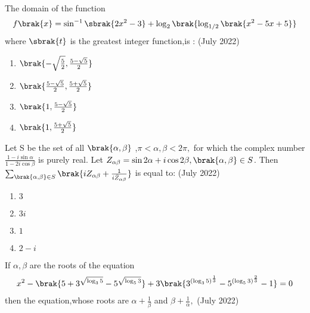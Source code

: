 \iffalse
\title{July 2022}
\author{EE24BTECH11058}
\section{mcq-single}
\fi

    \item The domain of the function 
    \begin{align*}
        f\brak{x} = \sin^{-1}\sbrak{2x^2 - 3}+ \log_2\brak{\log_{1/2}\brak{x^2 - 5x + 5}}
    \end{align*} where $\sbrak{t}$ is the greatest integer function,is : 
    \hfill(July 2022)
    
    \begin{enumerate}
        \item $\brak{-\sqrt{\frac{5}{2}},\frac{5-\sqrt{5}}{2}}$
        \item $\brak{\frac{5-\sqrt{5}}{2}, \frac{5+\sqrt{5}}{2}}$
        \item $\brak{1,\frac{5-\sqrt{5}}{2}}$ 
        \item $\brak{1,\frac{5+\sqrt{5}}{2}}$ \\
    \end{enumerate}
    

    \item Let S be the set of all $\brak{\alpha,\beta}$ ,$\pi <\alpha, \beta < 2\pi , $ for which the complex number $\frac{1-i\sin\alpha}{1-2i\cos\beta}$ is purely real. Let $Z_{\alpha\beta} =\sin2\alpha + i\cos2\beta,\brak{\alpha,\beta} \in S $. Then $\sum_{\brak{\alpha,\beta}\in S }\brak{iZ_{\alpha\beta} + \frac{1}{i\bar{Z}_{\alpha\beta}}} $ is equal to:
    \hfill(July 2022)
    
    
    \begin{enumerate}
        \item $3$
        \item $3i$
        \item $1$
        \item $2-i$
    \end{enumerate}
    

    \item  If $\alpha, \beta$ are the roots of the equation 
    \begin{align*}
        x^{2} - \brak{5 + 3^{\sqrt{\log_3{5}}} -  5^{\sqrt{\log_5{3}}}}  +  3\brak{3^{(\log_3{5})^\frac{1}{3}} - 5^{(\log_5{3})^\frac{2}{3}} - 1} = 0
    \end{align*} 
    then the equation,whose roots are $\alpha + \frac{1}{\beta} $ and $\beta + \frac{1}{\alpha},$ 
    \hfill(July 2022)
    
